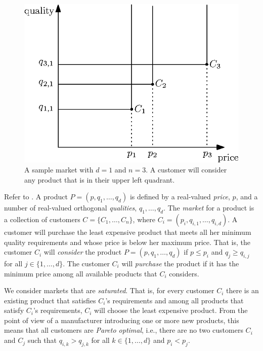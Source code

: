 \documentclass[lotsofwhite]{patmorin}
\begin{document}
\begin{figure}
  \begin{center}
    \includegraphics{intro}
  \end{center}
  \caption{A sample market with $d=1$ and $n=3$. A customer will consider
           any product that is in their upper left quadrant.}
\end{figure}

Refer to .  A product $P=(p,q_1,\ldots,q_d)$ is defined
by a real-valued \emph{price}, $p$, and a number of real-valued
orthogonal \emph{qualities}, $q_1,\ldots,q_d$.  The \emph{market} for
a product is a collection of customers $C=\{C_1,\ldots,C_n\}$, where
$C_i=(p_i,q_{i,1},\ldots,q_{i,d})$.  A customer will purchase the least
expensive product that meets all her minimum quality requirements and
whose price is below her maximum price.  That is, the customer $C_i$
will \emph{consider} the product $P=(p,q_1,\ldots,q_d)$ if $p \le p_i$
and $q_j \ge q_{i,j}$ for all $j\in\{1,\ldots,d\}$.  The customer $C_i$
will \emph{purchase} the product if it has the minimum price among all
available products that $C_i$ considers.

We consider markets that are \emph{saturated}.  That is, for every customer
$C_i$ there is an existing product that satisfies $C_i$'s
requirements and among all products that satisfy $C_i$'s requirements,
$C_i$ will choose the least expensive product.  From the point of view of a
manufacturer introducing one or more new products, this means that all
customers are \emph{Pareto optimal}, i.e., there are no two customers $C_i$
and $C_j$ such that $q_{i,k} > q_{j,k}$ for all $k\in\{1,\ldots,d\}$ and
$p_i < p_j$.  
\end{document}
